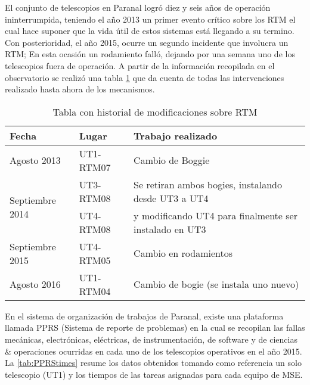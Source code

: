            El conjunto de telescopios en Paranal logró diez y seis años de operación ininterrumpida, teniendo el año 2013 un primer evento crítico sobre los RTM el cual hace suponer que la vida útil de estos sistemas está llegando a su termino. Con posterioridad, el año 2015, ocurre un segundo incidente que involucra un RTM; En esta ocasión un rodamiento falló, dejando por una semana uno de los telescopios fuera de operación. A partir de la información recopilada en el observatorio se realizó una tabla \ref{tab:RTMhistorial} que da cuenta de todas las intervenciones realizado hasta ahora de los mecanismos.
            \begin{table}[H]
                \centering
                \caption{Tabla con historial de modificaciones sobre RTM}
                \label{tab:RTMhistorial}
                \begin{tabular}{|l|l|p{7cm}|}
                \hline
                Fecha                            & Lugar     & Trabajo realizado                                      \\ \hline \hline
                Agosto 2013                      & UT1-RTM07 & Cambio de Boggie                                       \\ \hline
                \multirow{2}{*}{Septiembre 2014} & UT3-RTM08 & Se retiran ambos bogies, instalando desde UT3 a UT4    \\ \cline{2-3} 
                                                 & UT4-RTM08 & y modificando UT4 para finalmente ser instalado en UT3 \\ \hline
                Septiembre 2015                  & UT4-RTM05 & Cambio en rodamientos                                  \\ \hline
                Agosto 2016                      & UT1-RTM04 & Cambio de bogie (se instala uno nuevo)                 \\ \hline
                \end{tabular}
            \end{table}
             En el sistema de organización de trabajos de Paranal, existe una plataforma llamada PPRS  (Sistema de reporte de problemas) en la cual se recopilan las fallas mecánicas, electrónicas, eléctricas, de instrumentación, de software y de ciencias \& operaciones ocurridas en cada uno de los telescopios operativos en el año 2015. La \ref{tab:PPRStimes} resume los datos obtenidos tomando como referencia un solo telescopio (UT1) y los tiempos de las tareas asignadas para cada equipo de MSE. 
